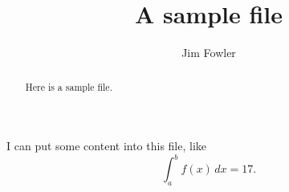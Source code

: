 \documentclass{ximera}
\title{A sample file}
\author{Jim Fowler}
\begin{document}
\begin{abstract}
Here is a sample file.
\end{abstract}

\maketitle

I can put some content into this file, like
\[
  \int_a^b f(x) \, dx = 17.
\]
\end{document}
